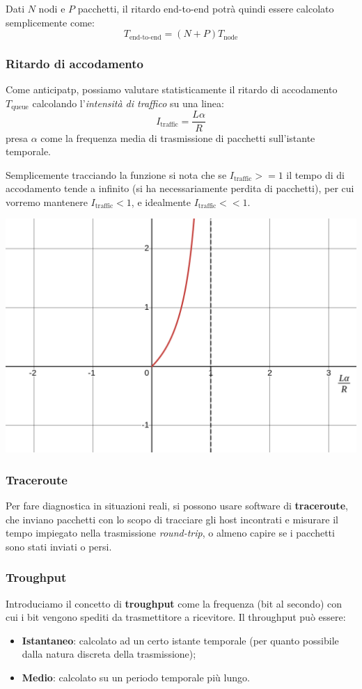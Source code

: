 \documentclass[a4paper,11pt]{article}
\begin{document}
Dati $N$ nodi e $P$ pacchetti, il ritardo end-to-end potrà quindi essere calcolato semplicemente come:
$$
T_{\text{end-to-end}} = (N + P) T_{\text{node}}
$$

\subsubsection{Ritardo di accodamento}
Come anticipatp, possiamo valutare statisticamente il ritardo di accodamento $T_{\text{queue}}$ calcolando l'\textit{intensità di traffico} su una linea:
$$
I_{\text{traffic}} = \frac{L \alpha}{R}
$$
presa $\alpha$ come la frequenza media di trasmissione di pacchetti sull'istante temporale.

Semplicemente tracciando la funzione si nota che se $I_{\text{traffic}} >= 1$ il tempo di di accodamento tende a infinito (si ha necessariamente perdita di pacchetti), per cui vorremo mantenere $I_{\text{traffic}} < 1$, e idealmente $I_{\text{traffic}} << 1$.

\begin{center}
	\includegraphics[scale=0.3]{../figures/traf_intensity.png}
\end{center}

\subsubsection{Traceroute}
Per fare diagnostica in situazioni reali, si possono usare software di \textbf{traceroute}, che inviano pacchetti con lo scopo di tracciare gli host incontrati e misurare il tempo impiegato nella trasmissione \textit{round-trip}, o almeno capire se i pacchetti sono stati inviati o persi. 

\subsubsection{Troughput}
Introduciamo il concetto di \textbf{troughput} come la frequenza (bit al secondo) con cui i bit vengono spediti da trasmettitore a ricevitore.
Il throughput può essere:
\begin{itemize}
	\item \textbf{Istantaneo}: calcolato ad un certo istante temporale (per quanto possibile dalla natura discreta della trasmissione);
	\item \textbf{Medio}: calcolato su un periodo temporale più lungo.
\end{itemize}
\end{document}
